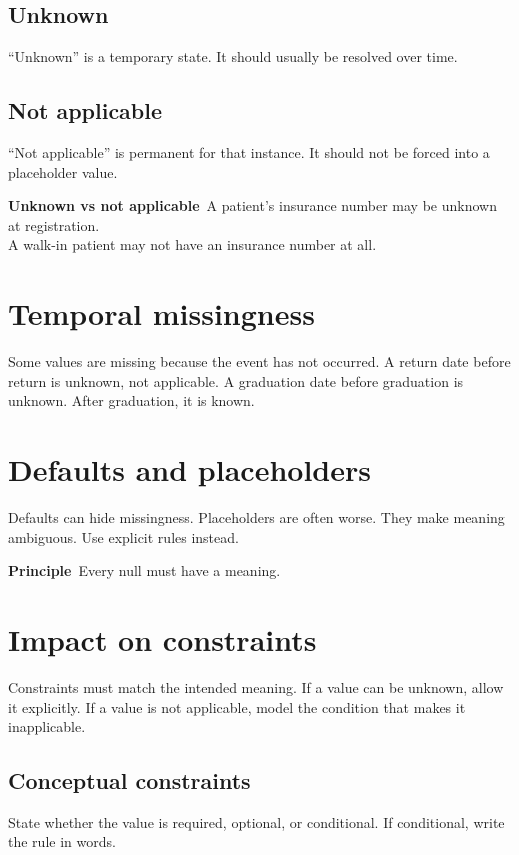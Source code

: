 \subsection{Unknown}
“Unknown” is a temporary state.
It should usually be resolved over time.

\subsection{Not applicable}
“Not applicable” is permanent for that instance.
It should not be forced into a placeholder value.

\begin{examplebox}
\textbf{Unknown vs not applicable}\
A patient’s insurance number may be unknown at registration.\\
A walk-in patient may not have an insurance number at all.
\end{examplebox}

\section{Temporal missingness}
Some values are missing because the event has not occurred.
A return date before return is unknown, not applicable.
A graduation date before graduation is unknown.
After graduation, it is known.

\section{Defaults and placeholders}
Defaults can hide missingness.
Placeholders are often worse.
They make meaning ambiguous.
Use explicit rules instead.

\begin{principlebox}
\textbf{Principle}\
Every null must have a meaning.
\end{principlebox}

\section{Impact on constraints}
Constraints must match the intended meaning.
If a value can be unknown, allow it explicitly.
If a value is not applicable, model the condition that makes it inapplicable.

\subsection{Conceptual constraints}
State whether the value is required, optional, or conditional.
If conditional, write the rule in words.

